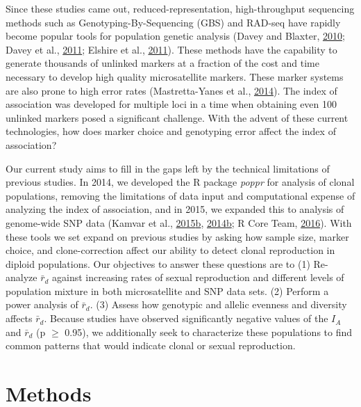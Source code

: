 \documentclass[double,12pt]{beavtex}
\begin{document}
  Since these studies came out, reduced-representation, high-throughput
  sequencing methods such as Genotyping-By-Sequencing (GBS) and RAD-seq
  have rapidly become popular tools for population genetic analysis (Davey
  and Blaxter, \protect\hyperlink{ref-davey2010rad}{2010}; Davey et al.,
  \protect\hyperlink{ref-davey2011genome}{2011}; Elshire et al.,
  \protect\hyperlink{ref-elshire2011robust}{2011}). These methods have the
  capability to generate thousands of unlinked markers at a fraction of
  the cost and time necessary to develop high quality microsatellite
  markers. These marker systems are also prone to high error rates
  (Mastretta-Yanes et al.,
  \protect\hyperlink{ref-mastretta2015restriction}{2014}). The index of
  association was developed for multiple loci in a time when obtaining
  even 100 unlinked markers posed a significant challenge. With the advent
  of these current technologies, how does marker choice and genotyping
  error affect the index of association?
  
  Our current study aims to fill in the gaps left by the technical
  limitations of previous studies. In 2014, we developed the R package
  \emph{poppr} for analysis of clonal populations, removing the
  limitations of data input and computational expense of analyzing the
  index of association, and in 2015, we expanded this to analysis of
  genome-wide SNP data (Kamvar et al.,
  \protect\hyperlink{ref-kamvar2015novel}{2015}\protect\hyperlink{ref-kamvar2015novel}{b},
  \protect\hyperlink{ref-kamvar2014poppr}{2014}\protect\hyperlink{ref-kamvar2014poppr}{b};
  R Core Team, \protect\hyperlink{ref-R2016}{2016}). With these tools we
  set expand on previous studies by asking how sample size, marker choice,
  and clone-correction affect our ability to detect clonal reproduction in
  diploid populations. Our objectives to answer these questions are to (1)
  Re-analyze \(\bar{r}_d\) against increasing rates of sexual reproduction
  and different levels of population mixture in both microsatellite and
  SNP data sets. (2) Perform a power analysis of \(\bar{r}_d\). (3) Assess
  how genotypic and allelic evenness and diversity affects \(\bar{r}_d\).
  Because studies have observed significantly negative values of the
  \(I_A\) and \(\bar{r}_d\) (p \(\geq\) 0.95), we additionally seek to
  characterize these populations to find common patterns that would
  indicate clonal or sexual reproduction.
  
  \section{Methods}\label{methods}
  
\end{document}
